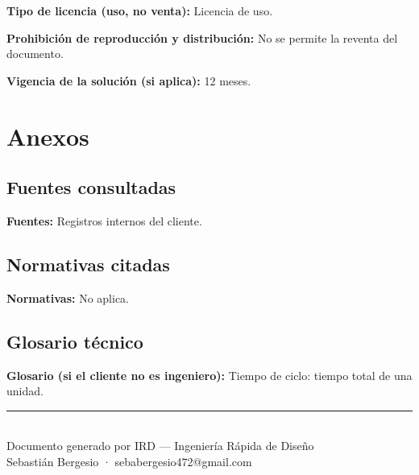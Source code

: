 \documentclass[11pt,a4paper]{article}
\newcommand{\campo}[2]{\noindent\textbf{\textcolor{irdblack}{#1:}} \textcolor{irdblack}{#2}\par\vspace{0.3em}}
\begin{document}
\campo{Tipo de licencia (uso, no venta)}{Licencia de uso.}
\campo{Prohibición de reproducción y distribución}{No se permite la reventa del documento.}
\campo{Vigencia de la solución (si aplica)}{12 meses.}

\section{Anexos}

\subsection{Fuentes consultadas}
\campo{Fuentes}{Registros internos del cliente.}

\subsection{Normativas citadas}
\campo{Normativas}{No aplica.}

\subsection{Glosario técnico}
\campo{Glosario (si el cliente no es ingeniero)}{Tiempo de ciclo: tiempo total de una unidad.}

\vfill

\begin{center}
{\color{irdorange}\rule{0.5\textwidth}{1pt}}\\[0.3cm]
{\small\color{irdblack} Documento generado por IRD --- Ingeniería Rápida de Diseño}\\
{\small\color{irdblack} Sebastián Bergesio · sebabergesio472@gmail.com}
\end{center}
\end{document}
